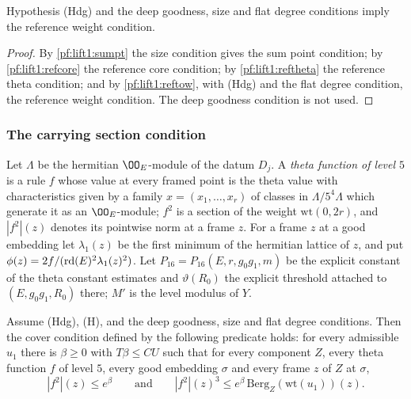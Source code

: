 \begin{theorem}\label{pf:lift1:refw}
Hypothesis (Hdg) and the deep goodness, size and flat degree conditions imply the reference weight
condition.
\end{theorem}

\begin{proof}
By \cref{pf:lift1:sumpt} the size condition gives the sum point condition; by \cref{pf:lift1:refcore}
the reference core condition; by \cref{pf:lift1:reftheta} the reference theta condition; and by
\cref{pf:lift1:reftow}, with (Hdg) and the flat degree condition, the reference weight condition. The
deep goodness condition is not used.
\end{proof}

\subsubsection*{The carrying section condition}
Let $\Lambda$ be the hermitian $\OO_E$-module of the datum $D_j$. A \emph{theta function of level $5$}
is a rule $f$ whose value at every framed point is the theta value with characteristics given by a
family $x=(x_1,\dots,x_r)$ of classes in $\Lambda/5^4\Lambda$ which generate it as an $\OO_E$-module; $f^2$
is a section of the weight $\mathrm{wt}(0,2r)$, and $|f^2|(z)$ denotes its pointwise norm at a frame $z$.
For a frame $z$ at a good embedding let $\lambda_1(z)$ be the first minimum of the hermitian lattice
of $z$, and put $\phi(z)=2f/(\mathrm{rd}(E)^2\lambda_1(z)^2)$. Let $P_{16}=P_{16}(E,r,g_0g_1,m)$ be the
explicit constant of the theta constant estimates and $\vartheta(R_0)$ the explicit threshold attached
to $(E,g_0g_1,R_0)$ there; $M'$ is the level modulus of $Y$.

\begin{theorem}\label{pf:lift1:thetaberg}
Assume (Hdg), (H), and the deep goodness, size and flat degree conditions. Then the cover condition
defined by the following predicate holds: for every admissible $u_1$ there is $\beta\ge0$ with
$T\beta\le CU$ such that for every component $Z$, every theta function $f$ of level $5$, every good
embedding $\sigma$ and every frame $z$ of $Z$ at $\sigma$,
\[
|f^2|(z)\le e^\beta\qquad\text{and}\qquad|f^2|(z)^3\le e^\beta\,\mathrm{Berg}_Z(\mathrm{wt}(u_1))(z).
\]
\end{theorem}


